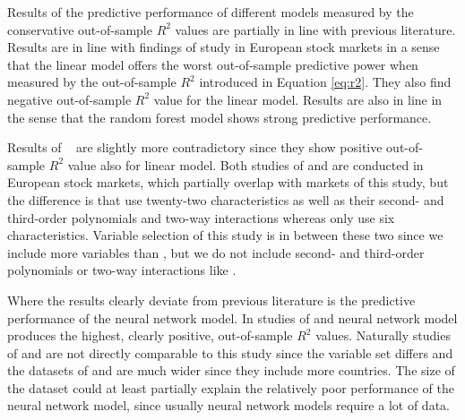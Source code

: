\documentclass[12pt]{article}
\begin{document}
Results of the predictive performance of different models measured by the conservative out-of-sample $R^2$ values are partially in line with previous literature. Results are in line with findings of \citet{Drobetz} study in European stock markets in a sense that the linear model offers the worst out-of-sample predictive power when measured by the out-of-sample $R^2$ introduced in Equation \ref{eq:r2}. They also find negative out-of-sample $R^2$ value for the linear model. Results are also in line in the sense that the random forest model shows strong predictive performance. \par

Results of \ \citet{Fieberg} are slightly more contradictory since they show positive out-of-sample $R^2$ value also for linear model\footnotemark. Both studies of \citeauthor{Drobetz} and \citeauthor{Fieberg} are conducted in European stock markets, which partially overlap with markets of this study, but the difference is that \citeauthor{Drobetz} use twenty-two characteristics as well as their  second- and third-order polynomials and two-way interactions whereas \citeauthor{Fieberg} only use six characteristics. Variable selection of this study is in between these two since we include more variables than \citeauthor{Fieberg}, but we do not include second- and third-order polynomials or two-way interactions like \citeauthor{Drobetz}. \par


Where the results clearly deviate from previous literature is the predictive performance of the neural network model. In studies of \citet{Drobetz} and \citet{Fieberg} neural network model produces the highest, clearly positive, out-of-sample $R^2$ values. Naturally studies of \citeauthor{Drobetz} and \citeauthor{Fieberg} are not directly comparable to this study since the variable set differs and the datasets of  \citeauthor{Drobetz} and \citeauthor{Fieberg} are much wider since they include more countries. The size of the dataset could at least partially explain the relatively poor performance of the neural network model, since usually neural network models require a lot of data. \par
\end{document}
